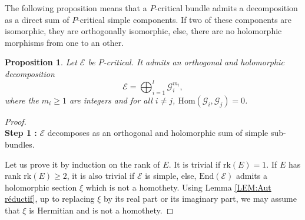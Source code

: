 \documentclass{article}
\newtheorem{proposition}[theorem]{Proposition}
\theoremstyle{remark}
\theoremstyle{definition}
\newcommand{\rk}{\mathrm{rk}}
\newcommand{\Hom}{\mathrm{Hom}}
\newcommand{\End}{\mathrm{End}}
\newcommand{\E}{\mathcal{E}}
\newcommand{\G}{\mathcal{G}}
\renewcommand{\geq}{\geqslant}
\begin{document}
The following proposition means that a $P$-critical bundle admits a decomposition as a direct sum of $P$-critical simple components. If two of these components are isomorphic, they are orthogonally isomorphic, else, there are no holomorphic morphisms from one to an other.

\begin{proposition}\label{PRO:Polysimplicité}
    Let $\E$ be $P$-critical. It admits an orthogonal and holomorphic decomposition
    $$
    \E = \bigoplus_{i = 1}^l \G_i^{m_i},
    $$
    where the $m_i \geq 1$ are integers and for all $i \neq j$, $\Hom(\G_i,\G_j) = 0$.
\end{proposition}
\begin{proof}\ \\
\noindent\textbf{Step 1 :} $\E$ decomposes as an orthogonal and holomorphic sum of simple sub-bundles.

Let us prove it by induction on the rank of $E$. It is trivial if $\rk(E) = 1$. If $E$ has rank $\rk(E) \geqslant 2$, it is also trivial if $\E$ is simple, else, $\End(\E)$ admits a holomorphic section $\xi$ which is not a homothety. Using Lemma \ref{LEM:Aut réductif}, up to replacing $\xi$ by its real part or its imaginary part, we may assume that $\xi$ is Hermitian and is not a homothety.


\end{proof}
\end{document}
